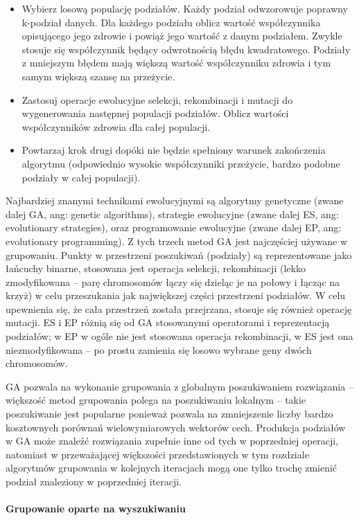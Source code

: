 \documentclass{article}
\newcommand{\myparagraph}[1]{\paragraph{#1}\mbox{}\\}
\begin{document}
\begin{itemize}
	\item Wybierz losową populację podziałów. Każdy podział odwzorowuje poprawny k-podział danych. Dla każdego podziału oblicz wartość współczynnika opisującego jego zdrowie i powiąż jego wartość z danym podziałem. Zwykle stosuje się współczynnik będący odwrotnością błędu kwadratowego. Podziały z mniejszym błędem mają większą wartość współczynniku zdrowia i tym samym większą szansę na przeżycie.
	\item Zastosuj operacje ewolucyjne selekcji, rekombinacji i mutacji do wygenerowania następnej populacji podziałów. Oblicz wartości współczynników zdrowia dla całej populacji. 
	\item Powtarzaj krok drugi dopóki nie będzie spełniony warunek zakończenia algorytmu (odpowiednio wysokie współczynniki przeżycie, bardzo podobne podziały w całej populacji).
\end{itemize}

Najbardziej znanymi technikami ewolucyjnymi są algorytmy genetyczne (zwane dalej GA, ang: genetic algorithms), strategie ewolucyjne (zwane dalej ES, ang: evolutionary strategies), oraz programowanie ewolucyjne (zwane dalej EP, ang: evolutionary programming). Z tych trzech metod GA jest najczęściej używane w grupowaniu. Punkty w przestrzeni poszukiwań (podziały) są reprezentowane jako łańcuchy binarne, stosowana jest operacja selekcji, rekombinacji (lekko zmodyfikowana – parę chromosomów łączy się dzieląc je na połowy i łącząc na krzyż) w celu przeszukania jak największej części przestrzeni podziałów. W celu upewnienia się, że cała przestrzeń została przejrzana, stosuje się również operację mutacji. ES i EP różnią się od GA stosowanymi operatorami i reprezentacją podziałów; w EP w ogóle nie jest stosowana operacja rekombinacji, w ES jest ona niezmodyfikowana – po prostu zamienia się losowo wybrane geny dwóch chromosomów. 

GA pozwala na wykonanie grupowania z globalnym poszukiwaniem rozwiązania – większość metod grupowania polega na poszukiwaniu lokalnym – takie poszukiwanie jest popularne ponieważ pozwala na zmniejszenie liczby bardzo kosztownych porównań wielowymiarowych wektorów cech. Produkcja podziałów w GA może znaleźć rozwiązania zupełnie inne od tych w poprzedniej operacji, natomiast w przeważającej większości przedstawionych w tym rozdziale algorytmów grupowania w kolejnych iteracjach mogą one tylko trochę zmienić podział znaleziony w poprzedniej iteracji. 

\myparagraph{Grupowanie oparte na wyszukiwaniu}
\end{document}
